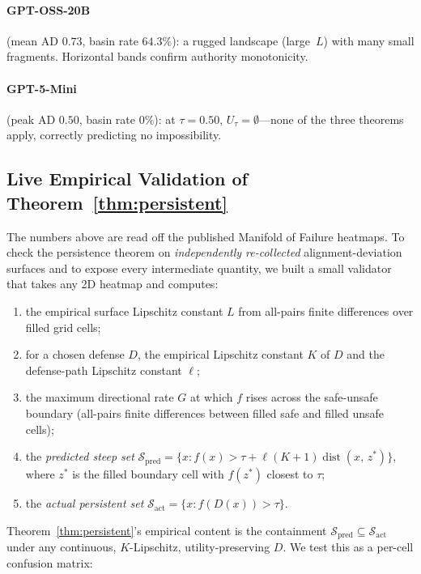 \documentclass[11pt]{article}
\newcommand{\dist}{\operatorname{dist}}
\begin{document}
\paragraph{GPT-OSS-20B} (mean AD $0.73$, basin rate $64.3\%$): a
rugged landscape (large~$L$) with many small fragments. Horizontal
bands confirm authority monotonicity.

\paragraph{GPT-5-Mini} (peak AD $0.50$, basin rate $0\%$): at
$\tau = 0.50$, $U_\tau = \emptyset$---none of the three theorems
apply, correctly predicting no impossibility.


\subsection{Live Empirical Validation of Theorem~\ref{thm:persistent}}
\label{sec:live-validation}

The numbers above are read off the published Manifold of Failure
heatmaps. To check the persistence theorem on \emph{independently
re-collected} alignment-deviation surfaces and to expose every
intermediate quantity, we built a small validator that takes any 2D
heatmap and computes:

\begin{enumerate}[nosep,leftmargin=*]
  \item the empirical surface Lipschitz constant $L$ from all-pairs
    finite differences over filled grid cells;
  \item for a chosen defense $D$, the empirical Lipschitz constant $K$
    of $D$ and the defense-path Lipschitz constant $\ell$;
  \item the maximum directional rate $G$ at which $f$ rises across the
    safe-unsafe boundary (all-pairs finite differences between filled
    safe and filled unsafe cells);
  \item the \emph{predicted steep set}
    $\mathcal{S}_{\text{pred}} =
    \{x : f(x) > \tau + \ell(K{+}1)\dist(x,\, z^{*})\}$,
    where $z^{*}$ is the filled boundary cell with $f(z^{*})$ closest
    to $\tau$;
  \item the \emph{actual persistent set}
    $\mathcal{S}_{\text{act}} = \{x : f(D(x)) > \tau\}$.
\end{enumerate}

Theorem~\ref{thm:persistent}'s empirical content is the
containment $\mathcal{S}_{\text{pred}} \subseteq \mathcal{S}_{\text{act}}$
under any continuous, $K$-Lipschitz, utility-preserving $D$. We test
this as a per-cell confusion matrix:
\end{document}
